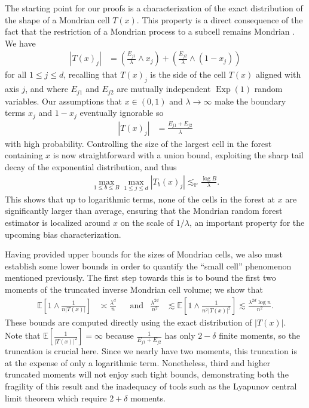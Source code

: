 \documentclass[11pt,lof]{puthesis}
\renewcommand{\P}{\ensuremath{\mathbb{P}}}
\newcommand{\E}{\ensuremath{\mathbb{E}}}
\DeclareMathOperator{\Exp}{Exp}
\theoremstyle{break}
\theoremstyle{proof}
\begin{document}
The starting point for our proofs is a characterization of the exact
distribution of the shape of a Mondrian cell $T(x)$. This property is a direct
consequence of the fact that the restriction of a Mondrian process to a subcell
remains Mondrian \citep[Fact~2]{mourtada2020minimax}. We have
%
\begin{align*}
  |T(x)_j|
  &= \left( \frac{E_{j1}}{\lambda} \wedge x_j \right)
  + \left( \frac{E_{j2}}{\lambda} \wedge (1-x_j) \right)
\end{align*}
%
for all $1 \leq j \leq d$, recalling that $T(x)_j$ is the side of the cell
$T(x)$ aligned with axis $j$, and where $E_{j1}$ and $E_{j2}$ are mutually
independent $\Exp(1)$ random variables. Our assumptions that $x \in (0,1)$ and
$\lambda \to \infty$ make the boundary terms $x_j$ and $1-x_j$
eventually ignorable so
%
\begin{align*}
  |T(x)_j| &= \frac{E_{j1} + E_{j2}}{\lambda}
\end{align*}
%
with high probability. Controlling the size of the largest cell in the forest
containing $x$ is now straightforward with a union bound, exploiting the sharp
tail decay of the exponential distribution, and thus
%
\begin{align*}
  \max_{1 \leq b \leq B} \max_{1 \leq j \leq d} |T_b(x)_j|
  \lesssim_\P \frac{\log B}{\lambda}.
\end{align*}
%
This shows that up to logarithmic terms, none of the cells in the forest at $x$
are significantly larger than average, ensuring that the Mondrian random forest
estimator is localized around $x$ on the scale of $1/\lambda$, an important
property for the upcoming bias characterization.

Having provided upper bounds for the sizes of Mondrian cells, we also must
establish some lower bounds in order to quantify the ``small cell'' phenomenon
mentioned previously. The first step towards this is to bound the first two
moments of the truncated inverse Mondrian cell volume; we show that
%
\begin{align*}
  \E\left[ 1 \wedge \frac{1}{n |T(x)|} \right]
  &\asymp \frac{\lambda^d}{n}
  &&\text{and}
  &\frac{\lambda^{2d}}{n^2}
  &\lesssim
  \E\left[ 1 \wedge \frac{1}{n^2 |T(x)|^2} \right]
  \lesssim \frac{\lambda^{2d} \log n}{n^2}.
\end{align*}
%
These bounds are computed directly using the exact distribution of $|T(x)|$.
Note that $\E\left[ \frac{1}{|T(x)|^2} \right] = \infty$ because
$\frac{1}{E_{j1} + E_{j2}}$ has only $2 - \delta$ finite moments, so the
truncation is crucial here. Since we nearly have two moments, this
truncation is at the expense of only a logarithmic term. Nonetheless, third and
higher truncated moments will not enjoy such tight bounds, demonstrating both
the fragility of this result and the inadequacy of tools such as the Lyapunov
central limit theorem which require $2 + \delta$ moments.
\end{document}
